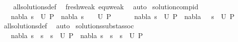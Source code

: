 \begin{isabellebody}
\ \ \isamarkupfalse%
\ all{\isacharunderscore}{\kern0pt}solutions{\isacharunderscore}{\kern0pt}def\ \isamarkupfalse%
\ fresh{\isacharunderscore}{\kern0pt}weak\ equ{\isacharunderscore}{\kern0pt}weak\ \isamarkupfalse%
\ auto%
\endisatagproof
{\isafoldproof}%
%
\isadelimproof
\isanewline
%
\endisadelimproof
\isanewline
{}\isamarkupfalse%
\ solution{\isacharunderscore}{\kern0pt}comp{\isacharunderscore}{\kern0pt}id{\isacharcolon}{\kern0pt}\ \isanewline
\ \ \ {\isachardoublequoteopen}{\isacharparenleft}{\kern0pt}{\isacharparenleft}{\kern0pt}nabla{\isacharcomma}{\kern0pt}\ s{\isacharparenright}{\kern0pt}\ {\isasymin}\ U\ P{\isacharparenright}{\kern0pt}\ {\isacharequal}{\kern0pt}\ {\isacharparenleft}{\kern0pt}{\isacharparenleft}{\kern0pt}nabla{\isacharcomma}{\kern0pt}\ s\ {\isasymbullet}\ {\isacharbrackleft}{\kern0pt}{\isacharbrackright}{\kern0pt}{\isacharparenright}{\kern0pt}\ {\isasymin}\ U\ P{\isacharparenright}{\kern0pt}{\isachardoublequoteclose}\ \ \isanewline
\ \ \ \ {\isachardoublequoteopen}{\isacharparenleft}{\kern0pt}{\isacharparenleft}{\kern0pt}nabla{\isacharcomma}{\kern0pt}\ s{\isacharparenright}{\kern0pt}\ {\isasymin}\ U\ P{\isacharparenright}{\kern0pt}\ {\isacharequal}{\kern0pt}\ {\isacharparenleft}{\kern0pt}{\isacharparenleft}{\kern0pt}nabla{\isacharcomma}{\kern0pt}\ {\isacharbrackleft}{\kern0pt}{\isacharbrackright}{\kern0pt}\ {\isasymbullet}\ s{\isacharparenright}{\kern0pt}\ {\isasymin}\ U\ P{\isacharparenright}{\kern0pt}{\isachardoublequoteclose}\isanewline
%
\isadelimproof
\ \ %
\endisadelimproof
%
\isatagproof
{}\isamarkupfalse%
\ all{\isacharunderscore}{\kern0pt}solutions{\isacharunderscore}{\kern0pt}def\ \isamarkupfalse%
\ auto%
\endisatagproof
{\isafoldproof}%
%
\isadelimproof
\isanewline
%
\endisadelimproof
\isanewline
{}\isamarkupfalse%
\ solutions{\isacharunderscore}{\kern0pt}subst{\isacharunderscore}{\kern0pt}assoc{\isacharcolon}{\kern0pt}\isanewline
\ \ \ {\isachardoublequoteopen}{\isacharparenleft}{\kern0pt}{\isacharparenleft}{\kern0pt}nabla{\isacharcomma}{\kern0pt}\ s{}\ {\isasymbullet}\ {\isacharparenleft}{\kern0pt}s{}\ {\isasymbullet}\ s{}{\isacharparenright}{\kern0pt}{\isacharparenright}{\kern0pt}\ {\isasymin}\ U\ P{\isacharparenright}{\kern0pt}\ {\isacharequal}{\kern0pt}\ {\isacharparenleft}{\kern0pt}{\isacharparenleft}{\kern0pt}nabla{\isacharcomma}{\kern0pt}\ {\isacharparenleft}{\kern0pt}s{}\ {\isasymbullet}\ s{}{\isacharparenright}{\kern0pt}\ {\isasymbullet}\ s{}{\isacharparenright}{\kern0pt}\ {\isasymin}\ U\ P{\isacharparenright}{\kern0pt}{\isachardoublequoteclose}\isanewline

\end{isabellebody}
